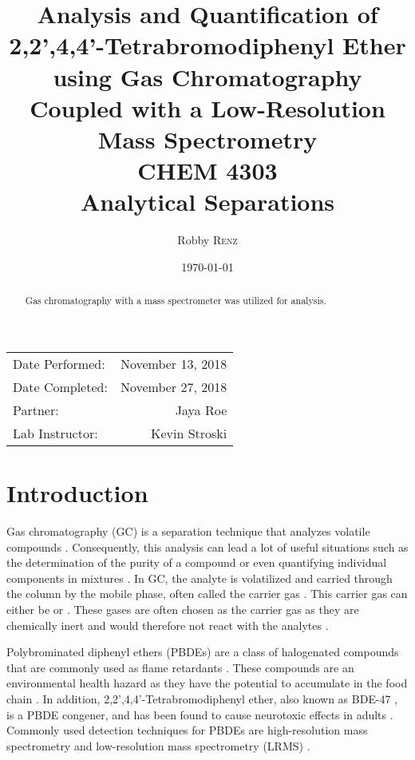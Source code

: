 \documentclass[a4paper, 12pt]{article}
\title{Analysis and Quantification of 2,2',4,4'-Tetrabromodiphenyl Ether using Gas Chromatography Coupled with a Low-Resolution Mass Spectrometry \\ CHEM 4303 \\ Analytical Separations} %
\author{Robby \textsc{Renz}} %
\date{\today} %
\begin{document}
\maketitle %

\begin{center}
	\begin{tabular}{l r}
		Date Performed: & November 13, 2018 \\ %
		Date Completed: & November 27, 2018 \\
		Partner: & Jaya Roe \\ %
		Lab Instructor: & Kevin Stroski %
	\end{tabular}
\end{center}


\begin{abstract}
	Gas chromatography with a mass spectrometer was utilized for analysis.
\end{abstract}
\newpage


\section{Introduction}
Gas chromatography (GC) is a separation technique that analyzes volatile compounds \cite{vitha_chromatography:_2017}. Consequently, this analysis can lead a lot of useful situations such as the determination of the purity of a compound or even quantifying individual components in mixtures \cite{vitha_chromatography:_2017}. In GC, the analyte is volatilized and carried through the column by the mobile phase, often called the carrier gas \cite{harris}. This carrier gas can either be  or  \cite{harris}. These gases are often chosen as the carrier gas as they are chemically inert and would therefore not react with the analytes \cite{vitha_chromatography:_2017}.

Polybrominated diphenyl ethers (PBDEs) are a class of halogenated compounds that are commonly used as flame retardants \cite{bjorklund_mass_2003}. These compounds are an environmental health hazard as they have the potential to accumulate in the food chain \cite{thomsen_comparing_2002}. In addition, 2,2',4,4'-Tetrabromodiphenyl ether, also known as BDE-47 \cite{rat}, is a PBDE congener, and has been found to cause neurotoxic effects in adults \cite{thomsen_comparing_2002}. Commonly used detection techniques for PBDEs are high-resolution mass spectrometry and low-resolution mass spectrometry (LRMS) \cite{bjorklund_mass_2003}.
\end{document}
